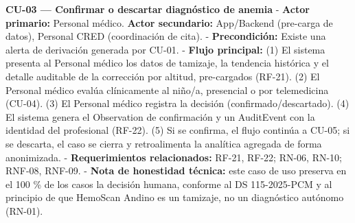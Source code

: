 \documentclass[11pt,a4paper]{article}
\begin{document}
\textbf{CU-03 --- Confirmar o descartar diagnóstico de anemia}
- \textbf{Actor primario:} Personal médico. \textbf{Actor secundario:} App/Backend (pre-carga de datos), Personal CRED (coordinación de cita).
- \textbf{Precondición:} Existe una alerta de derivación generada por CU-01.
- \textbf{Flujo principal:} (1) El sistema presenta al Personal médico los datos de tamizaje, la tendencia histórica y el detalle auditable de la corrección por altitud, pre-cargados (RF-21). (2) El Personal médico evalúa clínicamente al niño/a, presencial o por telemedicina (CU-04). (3) El Personal médico registra la decisión (confirmado/descartado). (4) El sistema genera el Observation de confirmación y un AuditEvent con la identidad del profesional (RF-22). (5) Si se confirma, el flujo continúa a CU-05; si se descarta, el caso se cierra y retroalimenta la analítica agregada de forma anonimizada.
- \textbf{Requerimientos relacionados:} RF-21, RF-22; RN-06, RN-10; RNF-08, RNF-09.
- \textbf{Nota de honestidad técnica:} este caso de uso preserva en el 100 \% de los casos la decisión humana, conforme al DS 115-2025-PCM y al principio de que HemoScan Andino es un tamizaje, no un diagnóstico autónomo (RN-01).
\end{document}
